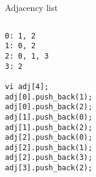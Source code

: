 \documentclass[12pt,t]{beamer}
\begin{document}
\begin{frame}[fragile]{Adjacency list}

    \begin{columns}[T]
        \begin{column}{.4\textwidth}
            \begin{verbatim}
0: 1, 2
1: 0, 2
2: 0, 1, 3
3: 2

vi adj[4];
adj[0].push_back(1);
adj[0].push_back(2);
adj[1].push_back(0);
adj[1].push_back(2);
adj[2].push_back(0);
adj[2].push_back(1);
adj[2].push_back(3);
adj[3].push_back(2);
            \end{verbatim}
        \end{column}%
        \hfill%
        \begin{column}{.4\textwidth}
            \begin{figure}
            \end{figure}
        \end{column}%
    \end{columns}
\end{frame}
\end{document}
